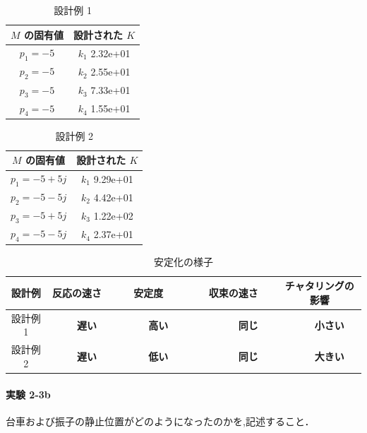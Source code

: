 \begin{table}[h]
  \centering
  \caption{設計例 1}
  \label{tab:design_example_1}
  \begin{tabular}{|c|c|}
    \hline
    \( M \) の固有値 & 設計された \( K \)  \\
    \hline
    \( p_1 = -5 \)   & \( k_1 \) 2.32e+01  \\
    \( p_2 = -5 \)   & \( k_2 \) 2.55e+01  \\
    \( p_3 = -5 \)   & \( k_3 \)  7.33e+01 \\
    \( p_4 = -5 \)   & \( k_4 \)  1.55e+01 \\
    \hline
  \end{tabular}
\end{table}

\begin{table}[h]
  \centering
  \caption{設計例 2}
  \label{tab:design_example_2}
  \begin{tabular}{|c|c|}
    \hline
    \( M \) の固有値    & 設計された \( K \)  \\
    \hline
    \( p_1 = -5 + 5j \) & \( k_1 \)  9.29e+01 \\
    \( p_2 = -5 - 5j \) & \( k_2 \) 4.42e+01  \\
    \( p_3 = -5 + 5j \) & \( k_3 \)  1.22e+02 \\
    \( p_4 = -5 - 5j \) & \( k_4 \)  2.37e+01 \\
    \hline
  \end{tabular}
\end{table}

\begin{table}[h]
  \centering
  \caption{安定化の様子}
  \label{tab:stabilization_observation}
  \begin{tabular}{|c|c|c|c|c|}
    \hline
    設計例   & 反応の速さ                    & 安定度                            & 収束の速さ                          & チャタリングの影響              \\
    \hline
    設計例 1 & {\large\textbf{　　遅い　　}} & {\large\textbf{　　高い　　}}     & {\large\textbf{　　　同じ　　　}}   & {\large\textbf{　　小さい　　}} \\
    設計例 2 & {\large\textbf{　　遅い　　}} & {\large\textbf{　　低い　　　　}} & {\large\textbf{　　　同じ　　　　}} & {\large\textbf{　　大きい　　}} \\
    \hline
  \end{tabular}
\end{table}

\paragraph{実験 2-3b}
台車および振子の静止位置がどのようになったのかを,記述すること．

